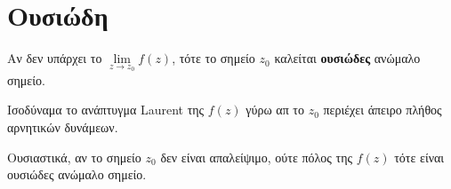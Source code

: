 \section*{Ουσιώδη}

\begin{dfn}
  Αν δεν υπάρχει το $\lim\limits_{z\to z_0}f(z)$, τότε το σημείο $z_0$ καλείται 
  \textbf{ουσιώδες} ανώμαλο σημείο. 

  \begin{myitemize}
    \item Ισοδύναμα το ανάπτυγμα Laurent της $f(z)$ \textcolor{Col2}{γύρω απ το $z_0$} 
      περιέχει άπειρο πλήθος αρνητικών δυνάμεων.
  \end{myitemize}
\end{dfn}

\begin{rem}
  Ουσιαστικά, αν το σημείο $z_0$ δεν είναι απαλείψιμο, ούτε πόλος της 
  $f(z)$ τότε είναι ουσιώδες ανώμαλο σημείο.
\end{rem}




